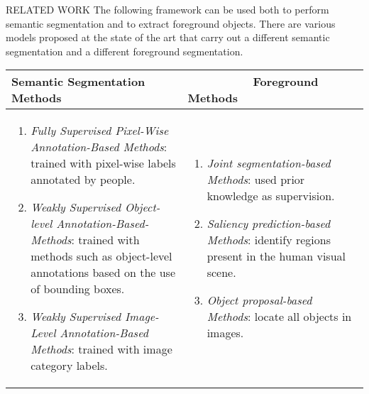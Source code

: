 \begin{frame}{RELATED WORK}
    The following framework can be used both to perform semantic 
    segmentation and to extract foreground objects. There are various 
    models proposed at the state of the art that carry out a different 
    semantic segmentation and a different foreground segmentation.
    \begin{table}[h!]
        \begin{adjustbox}{max width=\textwidth}
        \begin{tabular}{|p{6cm}|p{6cm}|}
            \hline
            \centering
            \bfseries{Semantic Segmentation Methods} &  ~~~~~~~~~~\bfseries{Foreground Methods} \\
            \hline
            \begin{enumerate}
                \item \emph{Fully Supervised Pixel-Wise Annotation-Based Methods}: trained with 
                pixel-wise labels annotated by people.
                \item \emph{Weakly Supervised Object-level Annotation-Based-Methods}: trained with 
                methods such as object-level annotations based on the use of bounding 
                boxes.
                \item \emph{Weakly Supervised Image-Level Annotation-Based Methods}: trained 
                with image category labels.
            \end{enumerate}
            & 
            \begin{enumerate}
                \item \emph{Joint segmentation-based Methods}: used prior knowledge as supervision.
                \item \emph{Saliency prediction-based Methods}: identify regions present in the human 
                visual scene.
                \item \emph{Object proposal-based Methods}: locate all objects in images.
            \end{enumerate}\\
            \hline
        \end{tabular}
        \end{adjustbox}
    \end{table}
\end{frame}
